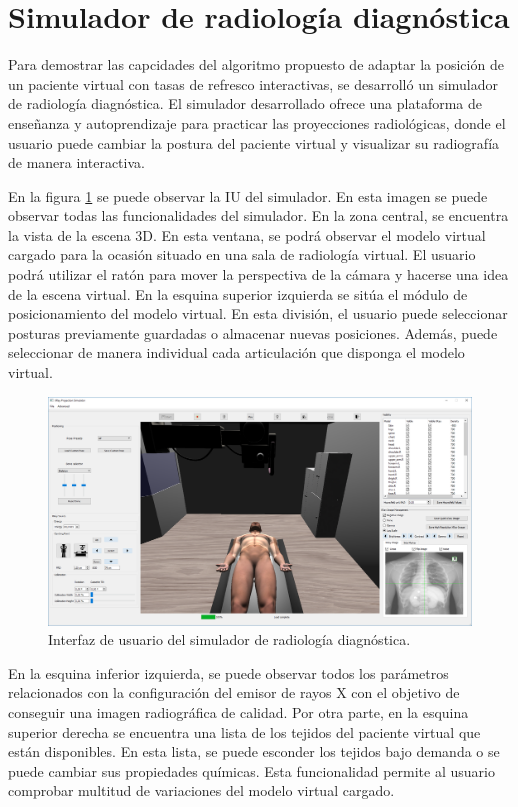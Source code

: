 \section{Simulador de radiología diagnóstica}
\label{result:xray}

Para demostrar las capcidades del algoritmo propuesto de adaptar la posición de un paciente virtual con tasas de refresco interactivas, se desarrolló un simulador de radiología diagnóstica. El simulador desarrollado ofrece una plataforma de enseñanza y autoprendizaje para practicar las proyecciones radiológicas, donde el usuario puede cambiar la postura del paciente virtual y visualizar su radiografía de manera interactiva. 

En la figura \ref{fig:simui} se puede observar la \ac{IU} del simulador. En esta imagen se puede observar todas las funcionalidades del simulador. 
En la zona central, se encuentra la vista de la escena 3D. En esta ventana, se podrá observar el modelo virtual cargado para la ocasión situado en una sala de radiología virtual. El usuario podrá utilizar el ratón para mover la perspectiva de la cámara y hacerse una idea de la escena virtual.
En la esquina superior izquierda se sitúa el módulo de posicionamiento del modelo virtual. En esta división, el usuario puede seleccionar posturas previamente guardadas o almacenar nuevas posiciones. Además, puede seleccionar de manera individual cada articulación que disponga el modelo virtual. 
\begin{figure}[h]
\centering
\includegraphics[width=0.95\linewidth]{IMG/simui.png}
\caption{\label{fig:simui} Interfaz de usuario del simulador de radiología diagnóstica. }
\end{figure}

En la esquina inferior izquierda, se puede observar todos los parámetros relacionados con la configuración del emisor de rayos X con el objetivo de conseguir una imagen radiográfica de calidad.
Por otra parte, en la esquina superior derecha se encuentra una lista de los tejidos del paciente virtual que están disponibles. En esta lista, se puede esconder los tejidos bajo demanda o se puede cambiar sus propiedades químicas. Esta funcionalidad permite al usuario comprobar multitud de variaciones del modelo virtual cargado.


